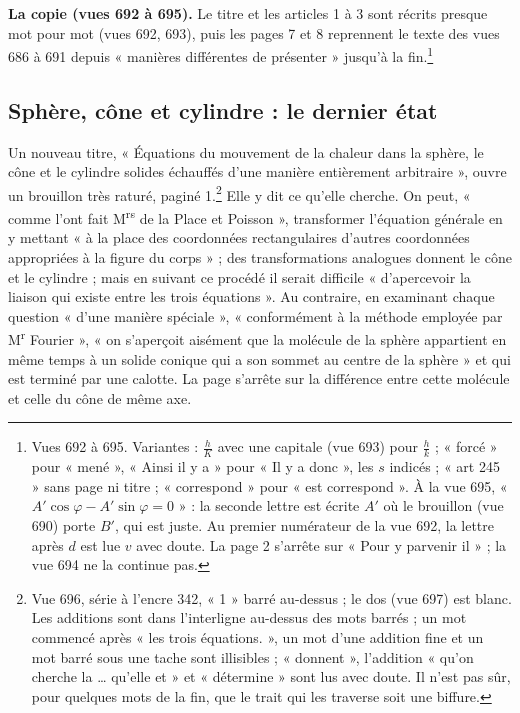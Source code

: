 \documentclass[11pt,a4paper]{article}
\begin{document}
\textbf{La copie (vues 692 à 695).} Le titre et les articles 1 à 3 sont
récrits presque mot pour mot (vues 692, 693), puis les pages 7 et 8 reprennent
le texte des vues 686 à 691 depuis « manières différentes de présenter » jusqu'à
la fin.\footnote{Vues 692 à 695. Variantes : $\frac hK$ avec une capitale (vue
693) pour $\frac hk$ ; « forcé » pour « mené », « Ainsi il y a » pour « Il y a
donc », les $s$ indicés ; « art 245 » sans page ni titre ; « correspond » pour
« est correspond ». À la vue 695, « $A'\cos\varphi - A'\sin\varphi = 0$ » : la
seconde lettre est écrite $A'$ où le brouillon (vue 690) porte $B'$, qui est
juste. Au premier numérateur de la vue 692, la lettre après $d$ est lue $v$
avec doute. La page 2 s'arrête sur « Pour y parvenir il » ; la vue 694 ne la
continue pas.}

\subsection*{Sphère, cône et cylindre : le dernier état}

Un nouveau titre, « Équations du mouvement de la chaleur dans la sphère, le
cône et le cylindre solides échauffés d'une manière entièrement arbitraire »,
ouvre un brouillon très raturé, paginé 1.\footnote{Vue 696, série à l'encre 342,
« 1 » barré au-dessus ; le dos (vue 697) est blanc. Les additions sont dans
l'interligne au-dessus des mots barrés ; un mot commencé après « les trois
équations. », un mot d'une addition fine et un mot barré sous une tache sont
illisibles ; « donnent », l'addition « qu'on cherche la … qu'elle et » et
« détermine » sont lus avec doute. Il n'est pas sûr, pour quelques mots de la
fin, que le trait qui les traverse soit une biffure.} Elle y dit ce qu'elle
cherche. On peut, « comme l'ont fait M\textsuperscript{rs} de la Place et
Poisson », transformer l'équation générale en y mettant « à la place des
coordonnées rectangulaires d'autres coordonnées appropriées à la figure du
corps » ; des transformations analogues donnent le cône et le cylindre ; mais
en suivant ce procédé il serait difficile « d'apercevoir la liaison qui existe
entre les trois équations ». Au contraire, en examinant chaque question
« d'une manière spéciale », « conformément à la méthode employée par
M\textsuperscript{r} Fourier », « on s'aperçoit aisément que la molécule de la
sphère appartient en même temps à un solide conique qui a son sommet au centre
de la sphère » et qui est terminé par une calotte. La page s'arrête sur la
différence entre cette molécule et celle du cône de même axe.
\end{document}
